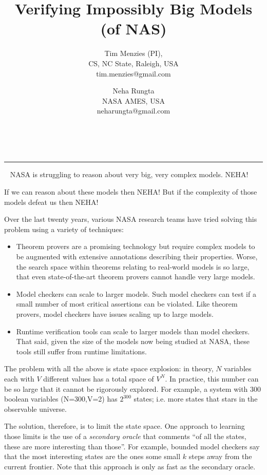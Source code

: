 \documentclass[12pt]{article}
\newcommand{\bi}{\begin{itemize}[leftmargin=0.5cm]}
\newcommand{\ei}{\end{itemize}}
\begin{document}
 
\vspace{-1cm}
\title{ Verifying Impossibly Big Models (of NAS)} 
\author{Tim Menzies (PI),\\
CS, NC State, Raleigh, USA\\
tim.menzies@gmail.com
\and
Neha Rungta\\
NASA AMES, USA\\
neharungta@gmail.com}
\date{}
\maketitle
\vspace{-0.75cm}
~\hrule~\newline
NASA is struggling to reason about very big, very complex models. NEHA! 

If we can reason about these models then NEHA! But if the complexity of those models
defeat us then NEHA!

Over the last twenty years, various
NASA research teams have tried solving this problem using a variety of techniques:
\bi
\item Theorem provers are a promising technology but require complex models to be augmented with extensive annotations describing their properties. Worse, the search space within theorems relating to real-world models is so large, that even state-of-the-art theorem provers cannot handle very large models.
\item Model checkers can scale to larger models. Such model checkers can test if a small number of most critical assertions can be violated. Like theorem provers, model checkers
have issues scaling up to large models.
\item Runtime verification tools can scale to larger models than model checkers. That
said, given the size of the models now being studied at NASA, these tools still suffer
from runtime limitations.
\ei
The problem with all the above is   state space explosion: in theory,
$N$ variables each with $V$ different values has a total space of $V^N$. In practice,
this number can be so large that it cannot be rigorously explored. For example, a system 
with 300 boolean variables (N=300,V=2) has $2^300$ states; i.e. more states that stars in the observable universe.

The solution, therefore, is to limit the state space. One approach to learning those limits
is the use of a {\em secondary oracle} that comments ``of all the states, these are more interesting than those''. For example, bounded model checkers say that the most interesting states are the ones some small $k$ steps away from the current frontier. Note that this approach is only as fast  as the secondary oracle.
\end{document}
